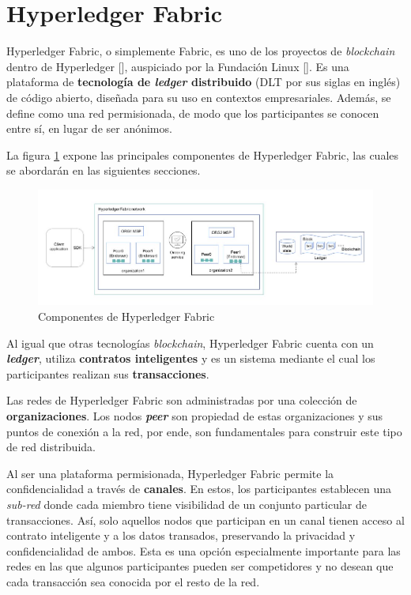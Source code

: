 \section{Hyperledger Fabric}

Hyperledger Fabric, o simplemente Fabric, es uno de los proyectos de \textit{blockchain} dentro de Hyperledger [\cite{hyperledger-foundation}], auspiciado por la Fundación Linux [\cite{linux-foundation}]. Es una plataforma de \textbf{tecnología de \textit{ledger} distribuido} (DLT por sus siglas en inglés) de código abierto, diseñada para su uso en contextos empresariales. Además, se define como una red permisionada, de modo que los participantes se conocen entre sí, en lugar de ser anónimos. 

La figura \ref{fig:hlfcomponents} expone las principales componentes de Hyperledger Fabric, las cuales se abordarán en las siguientes secciones. 

\begin{figure}[tbph]
\centering
\includegraphics[width=\textwidth]{Images/hlf_components}
\caption{Componentes de Hyperledger Fabric}
\label{fig:hlfcomponents}
\end{figure}


Al igual que otras tecnologías \textit{blockchain}, Hyperledger Fabric cuenta con un \textit{\textbf{ledger}}, utiliza \textbf{contratos inteligentes} y es un sistema mediante el cual los participantes realizan sus \textbf{transacciones}.

Las redes de Hyperledger Fabric son administradas por una colección de \textbf{organizaciones}. Los nodos \textit{\textbf{peer}} son propiedad de estas organizaciones y sus puntos de conexión a la red, por ende, son fundamentales para construir este tipo de red distribuida. 

Al ser una plataforma permisionada, Hyperledger Fabric permite la confidencialidad a través de \textbf{canales}. En estos, los participantes establecen una \textit{sub-red} donde cada miembro tiene visibilidad de un conjunto particular de transacciones. Así, solo aquellos nodos que participan en un canal tienen acceso al contrato inteligente y a los datos transados, preservando la privacidad y confidencialidad de ambos.
Esta es una opción especialmente importante para las redes en las que algunos participantes pueden ser competidores y no desean que cada transacción sea conocida por el resto de la red. 

